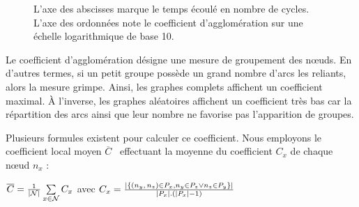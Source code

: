 \begin{figure}
  \centering
  \hspace{10pt}
  \caption[Coefficient d'agglomération]{\label{net:fig:clustering}L'axe des
    abscisses marque le temps écoulé en nombre de cycles. L'axe des ordonnées
    note le coefficient d'agglomération sur une échelle logarithmique de base
    10.}
\end{figure}

Le coefficient d'agglomération désigne une mesure de groupement des nœuds. En
d'autres termes, si un petit groupe possède un grand nombre d'arcs les reliants,
alors la mesure grimpe. Ainsi, les graphes complets affichent un coefficient
maximal. À l'inverse, les graphes aléatoires affichent un coefficient très bas
car la répartition des arcs ainsi que leur nombre ne favorise pas l'apparition
de groupes.

Plusieurs formules existent pour calculer ce coefficient. Nous employons le
coefficient local moyen $\overline{C}$~\cite{watts1998collective} effectuant la
moyenne du coefficient $C_x$ de chaque nœud $n_x$ :
\begin{center}
  $\overline{C} = {1\over |\mathcal{N}|}\sum\limits_{x\in\mathcal{N}}C_x$ \hfill
  avec
  $C_x = {|\{ (n_y,\,n_z) \in P_x, n_y \in P_z \vee n_z \in P_y \}|\over
    |P_x|.(|P_x|-1)}$
\end{center}

